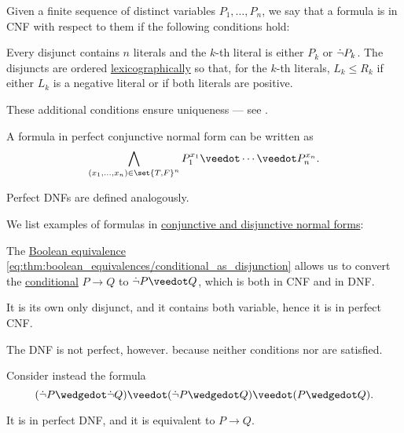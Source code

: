 \begin{definition}
\begin{thmenum}
     Given a finite sequence of distinct variables \( P_1, \ldots, P_n \), we say that a formula is in  CNF with respect to them if the following conditions hold:
    \begin{thmenum}
       Every disjunct contains \( n \) literals and the \( k \)-th literal is either \( P_k \) or \( \dot\neg P_k \).
       The disjuncts are ordered \hyperref[def:lexicographic_order]{lexicographically} so that, for the \( k \)-th literals, \( L_k \leq R_k \) if either \( L_k \) is a negative literal or if both literals are positive.
    \end{thmenum}

    These additional conditions ensure uniqueness --- see .

    A formula in perfect conjunctive normal form can be written as
    \begin{equation*}
      \bigwedge_{(x_1, \ldots, x_n) \in \set{ T, F }^n} P_1^{x_1} \synvee \cdots \synvee P_n^{x_n}.
    \end{equation*}

    Perfect DNFs are defined analogously.
  \end{thmenum}
\end{definition}

\begin{example}\label{ex:def:cnf_and_dnf}
  We list examples of formulas in \hyperref[def:cnf_and_dnf]{conjunctive and disjunctive normal forms}:
  \begin{thmenum}
     The \hyperref[thm:boolean_equivalences]{Boolean equivalence} \eqref{eq:thm:boolean_equivalences/conditional_as_disjunction} allows us to convert the \hyperref[def:propositional_language/connectives/conditional]{conditional} \( P \to Q \) to \( \synneg P \synvee Q \), which is both in CNF and in DNF.

    It is its own only disjunct, and it contains both variable, hence it is in perfect CNF.

    The DNF is not perfect, however. because neither conditions  nor  are satisfied.

     Consider instead the formula
    \begin{equation*}
      (\synneg P \synwedge \synneg Q) \synvee (\synneg P \synwedge Q) \synvee (P \synwedge Q).
    \end{equation*}

    It is in perfect DNF, and it is equivalent to \( P \to Q \).
  \end{thmenum}
\end{example}

